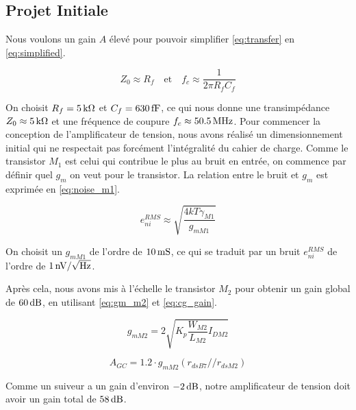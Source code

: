 \documentclass[a4paper,12pt]{article}
\numberwithin{equation}{section}
\newcommand{\?}{\stackrel{?}{=}}
\newcommand{\sis}[2]{\complexnum{#1}\,\si[per-mode=symbol]{#2}}
\begin{document}
\FloatBarrier

\subsection{Projet Initiale}

Nous voulons un gain $A$ élevé pour pouvoir simplifier \eqref{eq:transfer} en \eqref{eq:simplified}.

\begin{equation}\label{eq:simplified}
    Z_{0}\approx R_f
    \quad
    \text{et}
    \quad
    f_c\approx\frac{1}{2\pi R_fC_f}
\end{equation}

On choisit $R_f=\sis{5}{\kilo\ohm}$ et $C_f=\sis{630}{\femto\farad}$, ce qui nous donne une transimpédance $Z_0\approx\sis{5}{\kilo\ohm}$ et une fréquence de coupure $f_c\approx\sis{50.5}{\mega\hertz}$. Pour commencer la conception de l'amplificateur de tension, nous avons réalisé un dimensionnement initial qui ne respectait pas forcément l'intégralité du cahier de charge. Comme le transistor $M_1$ est celui qui contribue le plus au bruit en entrée, on commence par définir quel $g_m$ on veut pour le transistor. La relation entre le bruit et $g_m$ est exprimée en \eqref{eq:noise_m1}.

\begin{equation}\label{eq:noise_m1}
    e_{ni}^{RMS}\approx\sqrt{\frac{4kT\gamma_{M1}}{g_{mM1}}}
\end{equation}

On choisit un $g_{mM1}$ de l'ordre de $\sis{10}{\milli\siemens}$, ce qui se traduit par un bruit $e_{ni}^{RMS}$ de l'ordre de $\sis{1}{\nano\volt\per\sqrt{\hertz}}$.

Après cela, nous avons mis à l'échelle le transistor $M_2$ pour obtenir un gain global de $\sis{60}{\decibel}$, en utilisant \eqref{eq:gm_m2} et \eqref{eq:cg_gain}.

\begin{equation}\label{eq:gm_m2}
    g_{mM2}=2\sqrt{K_p\frac{W_{M2}}{L_{M2}}I_{DM2}}
\end{equation}

\begin{equation}\label{eq:cg_gain}
    A_{GC}=\num{1.2}\cdot g_{mM2}\left(r_{dsB7}//r_{dsM2}\right)
\end{equation}

Comme un suiveur a un gain d'environ $\sis{-2}{\decibel}$, notre amplificateur de tension doit avoir un gain total de $\sis{58}{\decibel}$.
\end{document}
